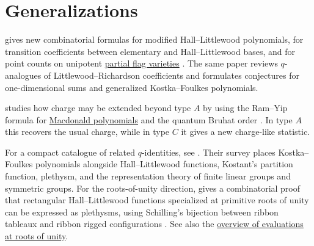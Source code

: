 \section[kostkaFoulkesGeneralizations]{Generalizations}

 gives new combinatorial formulas for modified
Hall--Littlewood polynomials, for transition coefficients between elementary
and Hall--Littlewood bases, and for point counts on unipotent
\hyperref[flagVarieties]{partial flag varieties} \cite{Kirillov2000}.  The
same paper reviews $q$-analogues of
Littlewood--Richardson coefficients and formulates conjectures for
one-dimensional sums and generalized Kostka--Foulkes polynomials.

 studies how charge may be extended beyond type $A$ by
using the Ram--Yip formula for \hyperref[macdonaldP]{Macdonald polynomials}
and the quantum Bruhat order \cite{Lenart2011x}.  In type $A$ this recovers
the usual charge, while in type $C$ it gives a new charge-like statistic.

For a compact catalogue of related $q$-identities, see
\cite{DesarmenienLeclercThibon1994}.  Their survey places
Kostka--Foulkes polynomials alongside Hall--Littlewood functions,
Kostant's partition function, plethysm, and the representation theory of
finite linear groups and symmetric groups.  For the roots-of-unity direction,
 gives a combinatorial proof that rectangular
Hall--Littlewood functions specialized at primitive roots of unity can be
expressed as plethysms, using Schilling's bijection between ribbon tableaux and
ribbon rigged configurations \cite{Descouens2008}.  See also the
\hyperref[prelimEvalAtRootsOfUnity]{overview of evaluations at roots of unity}.
